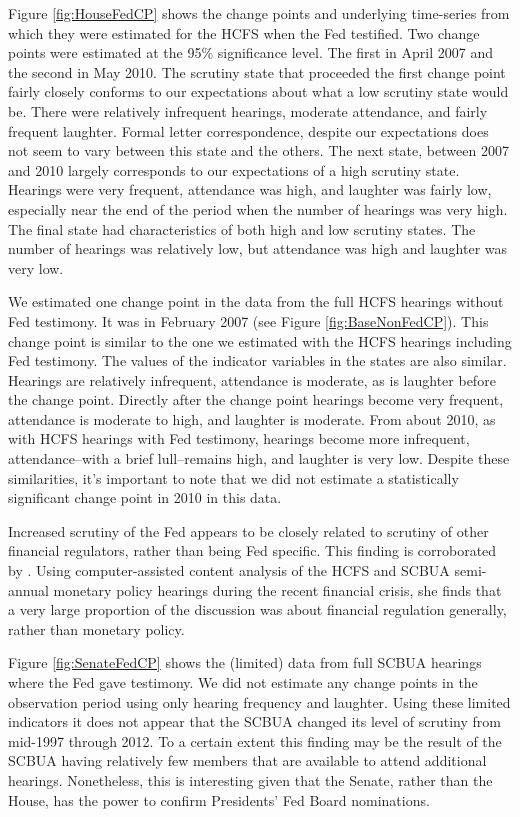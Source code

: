 \documentclass[a4paper]{article}\usepackage[]{graphicx}\usepackage[]{color}
\begin{document}
Figure \ref{fig:HouseFedCP} shows the change points and underlying time-series from which they were estimated for the HCFS when the Fed testified. Two change points were estimated at the 95\% significance level. The first in April 2007 and the second in May 2010. The scrutiny state that proceeded the first change point fairly closely conforms to our expectations about what a low scrutiny state would be. There were relatively infrequent hearings, moderate attendance, and fairly frequent laughter. Formal letter correspondence, despite our expectations does not seem to vary between this state and the others. The next state, between 2007 and 2010 largely corresponds to our expectations of a high scrutiny state. Hearings were very frequent, attendance was high, and laughter was fairly low, especially near the end of the period when the number of hearings was very high. The final state had characteristics of both high and low scrutiny states. The number of hearings was relatively low, but attendance was high and laughter was very low.

We estimated one change point in the data from the full HCFS hearings without Fed testimony. It was in February 2007 (see Figure \ref{fig:BaseNonFedCP}). This change point is similar to the one we estimated with the HCFS hearings including Fed testimony. The values of the indicator variables in the states are also similar. Hearings are relatively infrequent, attendance is moderate, as is laughter before the change point. Directly after the change point hearings become very frequent, attendance is moderate to high, and laughter is moderate. From about 2010, as with HCFS hearings with Fed testimony, hearings become more infrequent, attendance--with a brief lull--remains high, and laughter is very low. Despite these similarities, it's important to note that we did not estimate a statistically significant change point in 2010 in this data.

Increased scrutiny of the Fed appears to be closely related to scrutiny of other financial regulators, rather than being Fed specific. This finding is corroborated by \cite{SchonhardtBailey2012}. Using computer-assisted content analysis of the HCFS and SCBUA semi-annual monetary policy hearings during the recent financial crisis, she finds that a very large proportion of the discussion was about financial regulation generally, rather than monetary policy.

Figure \ref{fig:SenateFedCP} shows the (limited) data from full SCBUA hearings where the Fed gave testimony. We did not estimate any change points in the observation period using only hearing frequency and laughter. Using these limited indicators it does not appear that the SCBUA changed its level of scrutiny from mid-1997 through 2012. To a certain extent this finding may be the result of the SCBUA having relatively few members that are available to attend additional hearings. Nonetheless, this is interesting given that the Senate, rather than the House, has the power to confirm Presidents' Fed Board nominations.
\end{document}
